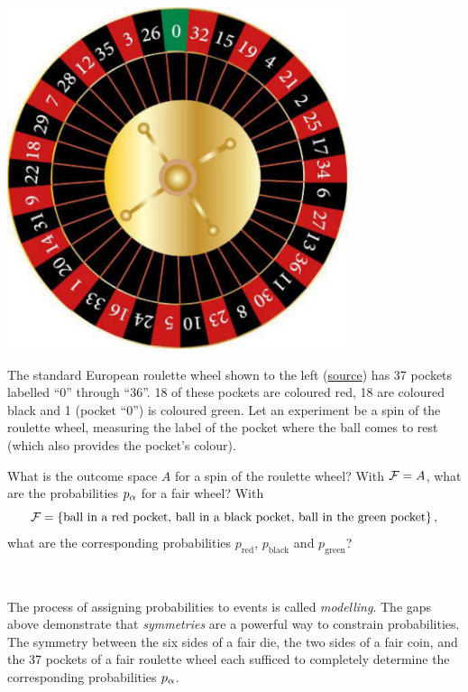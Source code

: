\begin{minipage}{0.4\textwidth}
  \includegraphics[width=0.75\textwidth]{figs/unit01_roulette.pdf}
\end{minipage}%
\begin{minipage}{0.5\textwidth}
  The standard European roulette wheel shown to the left (\href{https://www.vecteezy.com/vector-art/658761-casino-roulette-wheel}{source}) has 37 pockets labelled ``0'' through ``36''.
  18 of these pockets are coloured red, 18 are coloured black and 1 (pocket ``0'') is coloured green.
  Let an experiment be a spin of the roulette wheel, measuring the label of the pocket where the ball comes to rest (which also provides the pocket's colour).
\end{minipage}

\noindent What is the outcome space $A$ for a spin of the roulette wheel?
With $\mathcal F = A$, what are the probabilities $p_{\alpha}$ for a fair wheel?
With
\begin{equation*}
  \mathcal F = \left\{\mbox{ball in a red pocket, ball in a black pocket, ball in the green pocket}\right\},
\end{equation*}
what are the corresponding probabilities $p_{\text{red}}$, $p_{\text{black}}$ and $p_{\text{green}}$?
\begin{mdframed}
  \ \\[100 pt]
\end{mdframed}

The process of assigning probabilities to events is called \textit{modelling}.
The gaps above demonstrate that \textit{symmetries} are a powerful way to constrain probabilities.
The symmetry between the six sides of a fair die, the two sides of a fair coin, and the 37 pockets of a fair roulette wheel each sufficed to completely determine the corresponding probabilities $p_{\alpha}$.

